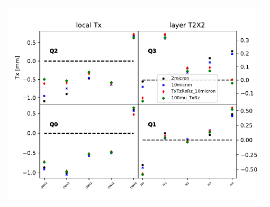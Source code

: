 \documentclass[aspectratio=1610, 12pt]{beamer}
\begin{document}
\begin{frame}
\begin{columns}
\begin{column}[c]{0.5\textwidth}
\begin{figure}
        \includegraphics[width=0.6\textwidth]{plots/compi/Tx/blue_red_comp_T2X2_Tx.pdf}
      \end{figure}
    \end{column}
  \end{columns}
\end{frame}
\end{document}
